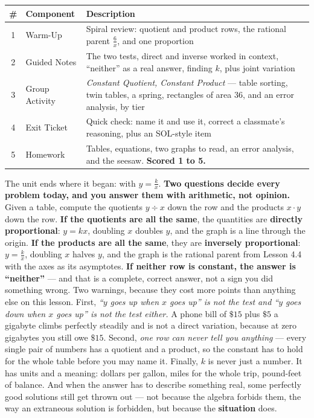 \documentclass[10pt]{article}
\begin{document}
\begin{tocbox}
\small
\renewcommand{\arraystretch}{1.5}
\begin{tabularx}{\linewidth}{@{} c l X @{}}
\rowcolor{forestbg}
\textbf{\#} & \textbf{Component} & \textbf{Description} \\
\midrule
1 & Warm-Up        & Spiral review: quotient and product rows, the rational parent $\frac6x$, and one proportion \\
2 & Guided Notes   & The two tests, direct and inverse worked in context, ``neither'' as a real answer, finding $k$, plus joint variation \\
3 & Group Activity & \emph{Constant Quotient, Constant Product} --- table sorting, twin tables, a spring, rectangles of area 36, and an error analysis, by tier \\
4 & Exit Ticket    & Quick check: name it and use it, correct a classmate's reasoning, plus an SOL-style item \\
5 & Homework       & Tables, equations, two graphs to read, an error analysis, and the seesaw. \textbf{Scored 1 to 5.} \\
\end{tabularx}
\end{tocbox}

\vspace{0.10in}

\begin{remindbox}
\small The unit ends where it began: with $y=\frac kx$. \textbf{Two questions decide every problem
today, and you answer them with arithmetic, not opinion.} Given a table, compute the quotients
$y\div x$ down the row and the products $x\cdot y$ down the row. \textbf{If the quotients are all the
same}, the quantities are \textbf{directly proportional}: $y=kx$, doubling $x$ doubles $y$, and the
graph is a line through the origin. \textbf{If the products are all the same}, they are
\textbf{inversely proportional}: $y=\frac kx$, doubling $x$ halves $y$, and the graph is the rational
parent from Lesson 4.4 with the axes as its asymptotes. \textbf{If neither row is constant, the answer
is ``neither''} --- and that is a complete, correct answer, not a sign you did something wrong. Two
warnings, because they cost more points than anything else on this lesson. First, \emph{``$y$ goes up
when $x$ goes up'' is not the test and ``$y$ goes down when $x$ goes up'' is not the test either.} A
phone bill of $\$15$ plus $\$5$ a gigabyte climbs perfectly steadily and is not a direct variation,
because at zero gigabytes you still owe $\$15$. Second, \emph{one row can never tell you anything} ---
every single pair of numbers has a quotient and a product, so the constant has to hold for the whole
table before you may name it. Finally, $k$ is never just a number. It has units and a meaning: dollars
per gallon, miles for the whole trip, pound-feet of balance. And when the answer has to describe
something real, some perfectly good solutions still get thrown out --- not because the algebra forbids
them, the way an extraneous solution is forbidden, but because the \textbf{situation} does.
\end{remindbox}
\end{document}
